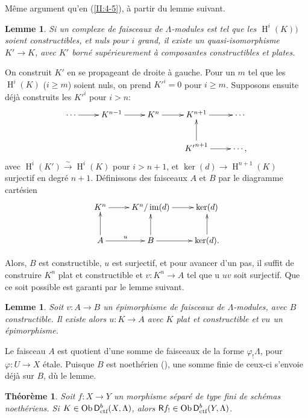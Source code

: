\documentclass{book}
\DeclareMathOperator{\h}{H}
\DeclareMathOperator{\im}{im}
\DeclareMathOperator{\ob}{Ob}
\newcommand{\iso}{\xrightarrow\sim}
\newcommand{\R}{\mathsf{R}}
\newcommand{\D}{\mathsf{D}}
\newtheorem{lemma_}[subsection]{Lemme}
\newtheorem{theorem_}[subsection]{Théorème}
\begin{document}
M\^eme argument qu'en (\ref{II:4-5}), \`a partir du lemme suivant. 





\begin{lemma_}\label{II:4-7}
Si un complexe de faisceaux de $\Lambda$-modules est tel que les $\h^i(K))$ 
soient constructibles, et nuls pour $i$ grand, il existe un 
quasi-isomorphisme $K'\to K$, avec $K'$ born\'e sup\'erieurement \`a 
composantes constructibles et plates.
\end{lemma_}

On construit $K'$ en se propageant de droite \`a gauche. Pour un $m$ tel que les 
$\h^i(K)$ ($i\geqslant m$) soient nuls, on prend ${K'}^i = 0$ pour 
$i\geqslant m$. Supposons ensuite d\'ej\`a construits les ${K'}^i$ pour 
$i>n$:
\[\xymatrix{
  \cdots \ar[r] 
    & K^{n-1} \ar[r] 
    & K^n \ar[r] 
    & K^{n+1} \ar[r] 
    & \cdots \\
  & & & {K'}^{n+1} \ar[u] \ar[r] 
    & \cdots \text{,}
}\]
avec $\h^i(K')\iso \h^i(K)$ pour $i>n+1$, et $\ker(d)\to\h^{n+1}(K)$ surjectif 
en degr\'e $n+1$. D\'efinissons des faisceaux $A$ et $B$ par le diagramme 
cart\'esien 
\[\xymatrix{
  K^n \ar[r] 
    & K^n/\im(d) \ar[r] 
    & \ker(d) \\
  A \ar[u] \ar[r]^u 
    & B \ar[u]\ar[r] 
    & \ker(d) \ar[u] \text{.}
}\]

Alors, $B$ est constructible, $u$ est surjectif, et pour avancer d'un pas, il 
suffit de construire $K^n$ plat et constructible et $v:K^n\to A$ tel que u
$u v$ soit surjectif. Que ce soit possible est garanti par le lemme suivant. 





\begin{lemma_}\label{II:4-8}
Soit $v:A\to B$ un \'epimorphisme de faisceaux de $\Lambda$-modules, avec $B$ 
constructible. Il existe alors $u:K\to A$ avec $K$ plat et constructible et 
$v u$ un \'epimorphisme. 
\end{lemma_}

Le faisceau $A$ est quotient d'une somme de faisceaux de la forme 
$\varphi_! \Lambda$, pour $\varphi:U\to X$ \'etale. Puisque $B$ est noeth\'erien 
(\cite[IX.2.10]{4}), une somme finie de ceux-ci s'envoie d\'ej\`a sur $B$, 
d\`u le lemme. 





\begin{theorem_}\label{II:4-9}
Soit $f:X\to Y$ un morphisme s\'epar\'e de type fini de sch\'emas noeth\'eriens. 
Si $K\in\ob\D_\textnormal{ctf}^b(X,\Lambda)$, alors 
$\R f_!\in \ob\D_\textnormal{ctf}^b(Y,\Lambda)$. 
\end{theorem_}
\end{document}

